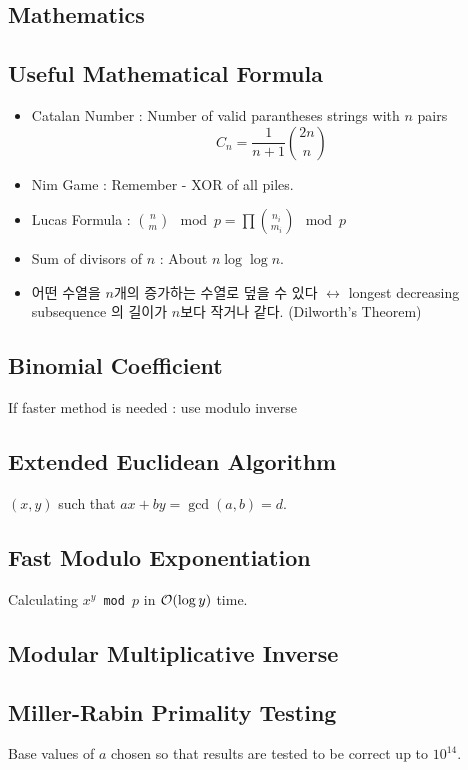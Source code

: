 \documentclass[landscape,8pt]{article}
\begin{document}
\begin{multicols}{2}
\section{Mathematics}
  \subsection{Useful Mathematical Formula}
    \begin{itemize}
      \item Catalan Number : Number of valid parantheses strings with $n$ pairs
      \[
        C_n = \frac{1}{n+1}\binom{2n}{n}
      \]
      \item Nim Game : Remember - XOR of all piles.
      \item Lucas Formula : $\binom{n}{m} \mod p = \prod \binom{n_i}{m_i} \mod p$
      \item Sum of divisors of $n$ : About $n \log \log n$.
      \item 어떤 수열을 $n$개의 증가하는 수열로 덮을 수 있다 $\leftrightarrow$ longest decreasing subsequence 의 길이가 $n$보다 작거나 같다. (Dilworth's Theorem)
    \end{itemize}
  \subsection{Binomial Coefficient}
    If faster method is needed : use modulo inverse
    
  \subsection{Extended Euclidean Algorithm}
    $(x, y)$ such that $ax + by = \gcd(a, b) = d$.
    

  \subsection{Fast Modulo Exponentiation}
  Calculating \texttt{$x^y$ mod $p$} in $\order{\log y}$ time.
    

  \subsection{Modular Multiplicative Inverse}
    

  \subsection{Miller-Rabin Primality Testing}
  Base values of $a$ chosen so that results are tested to be correct up to $10^{14}$.
    


\end{multicols}
\end{document}
